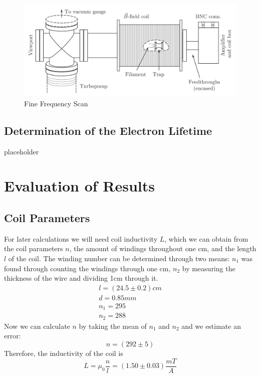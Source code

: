 \documentclass[12pt]{article}
\begin{document}
\begin{figure}[h]
	\centering
	\includegraphics[width=16cm,bbllx=112,bburx=447,bblly=264,bbury=582]{versuchsaufbau.JPG}
	\caption{Fine Frequency Scan}
	\label{fig::FFS}
\end{figure}

\subsection{Determination of the Electron Lifetime}
placeholder

\section{Evaluation of Results}
\subsection{Coil Parameters}
For later calculations we will need coil inductivity $L$, which we can obtain from the coil parameters $n$, the amount of windings throughout one cm, and the length $l$ of the coil.
The winding number can be determined through two means: $n_1$ was found through counting the windings through one cm, $n_2$ by measuring the thickness of the wire and dividing 1cm through it.
\begin{equation*}
\begin{aligned}
l = (24.5 \pm 0.2)cm \\
d = 0.85mm \\
n_1 = 295 \\
n_2 = 288
\end{aligned}
\end{equation*}
Now we can calculate $n$ by taking the mean of $n_1$ and $n_2$ and we estimate an error:
\begin{equation*}
n = (292 \pm 5)
\end{equation*}
Therefore, the inductivity of the coil is
\begin{equation*}
L = \mu_0\frac{n}{l} = (1.50 \pm 0.03)\frac{mT}{A}
\end{equation*}
\end{document}
